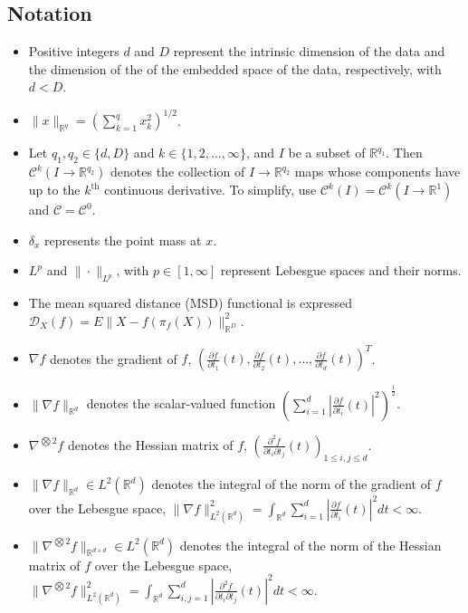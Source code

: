 \subsection*{Notation}
\begin{itemize}
    \item Positive integers $d$ and $D$ represent the intrinsic dimension of the data and the dimension of the of the embedded space of the data, respectively, with $d < D$.
    \item $\|x\|_{\mathbb{R}^q} = \left(\sum_{k=1}^{q} x_k^2\right)^{1/2}$.
    \item Let $q_1, q_2 \in \{d, D\}$ and $k \in \{1, 2, \dots, \infty\}$, and $I$ be a subset of $\mathbb{R}^{q_1}$. Then $\mathcal{C}^{k}(I \to \mathbb{R}^{q_2})$ denotes the collection of $I \to \mathbb{R}^{q_2}$ maps whose components have up to the $k^{\text{th}}$ continuous derivative. To simplify, use $\mathcal{C}^{k}(I) = \mathcal{C}^{k}(I \to \mathbb{R}^{1})$ and $\mathcal{C} = \mathcal{C}^{0}$.
    \item $\delta_x$ represents the point mass at $x$.
    \item $L^{p}$ and $\|\cdot\|_{L^{p}}$, with $p \in [1, \infty]$ represent Lebesgue spaces and their norms.
    \item The mean squared distance (MSD) functional is expressed $\mathcal{D}_X(f) = E\|X - f(\pi_f(X))\|_{\mathbb{R}^{D}}^2$.
    \item $\nabla f$ denotes the gradient of $f$, $\left(\frac{\partial f}{\partial t_1}(t), \frac{\partial f}{\partial t_2}(t), \dots, \frac{\partial f}{\partial t_d}(t)\right)^{T}$.
    \item $\|\nabla  f\|_{\mathbb{R}^{d}}$ denotes the scalar-valued function $\left(\sum_{i=1}^{d}\left|\frac{\partial f}{\partial t_i}(t)\right|^2\right)^{\frac{1}{2}}$.
    \item $\nabla^{\bigotimes 2}f$ denotes the Hessian matrix of $f$, $\left(\frac{\partial^{2}f}{\partial t_i \partial t_j}(t)\right)_{1 \leq i, j \leq d}$.
    \item $\|\nabla f\|_{\mathbb{R}^{d}} \in L^2(\mathbb{R}^{d})$ denotes the integral of the norm of the gradient of $f$ over the Lebesgue space, $\|\nabla f\|_{L^2(\mathbb{R}^{d})}^{2} = \int_{\mathbb{R}^{d}} \sum_{i=1}^d \left|\frac{\partial f}{\partial t_i}(t)\right|^2dt < \infty$.
    \item $\|\nabla^{\bigotimes 2}f\|_{\mathbb{R}^{d \times d}} \in L^2(\mathbb{R}^{d})$ denotes the integral of the norm of the Hessian matrix of $f$ over the Lebesgue space, $\|\nabla^{\bigotimes 2}f\|_{L^2(\mathbb{R}^{d})}^2 = \int_{\mathbb{R}^{d}}\sum_{i, j = 1}^{d}\left|\frac{\partial^2f}{\partial t_i \partial t_j}(t)\right|^2dt < \infty$.
\end{itemize}

